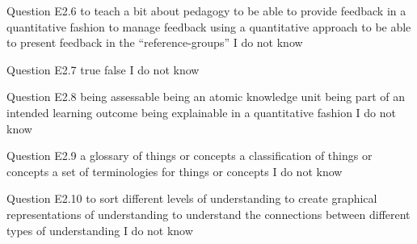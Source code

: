 \begin{frame}{Question E2.6}
	\QuestionNotes{}
	\QuestionAnswers
	{
		\answer to teach a bit about pedagogy
		\answer to be able to provide feedback in a quantitative fashion
		\correctanswer to manage feedback using a quantitative approach
		\answer to be able to present feedback in the ``reference-groups''
		\answer I do not know
	}
\end{frame}


\begin{frame}{Question E2.7}
	\QuestionAnswers
	{
		\answer true
		\correctanswer false
		\answer I do not know
	}
\end{frame}


\begin{frame}{Question E2.8}
	\QuestionAnswers
	{
		\correctanswer being assessable
		\answer being an atomic knowledge unit
		\answer being part of an intended learning outcome
		\answer being explainable in a quantitative fashion
		\answer I do not know
	}
\end{frame}


\begin{frame}{Question E2.9}
	\QuestionNotes{}
	\QuestionAnswers
	{
		\answer a glossary of things or concepts
		\correctanswer a classification of things or concepts
		\answer a set of terminologies for things or concepts
		\answer I do not know
	}
\end{frame}


\begin{frame}{Question E2.10}
	\QuestionNotes{}
	\QuestionAnswers
	{
		\correctanswer to sort different levels of understanding
		\answer to create graphical representations of understanding
		\answer to understand the connections between different types of understanding
		\answer I do not know
	}
\end{frame}



